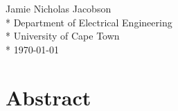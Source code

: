 \documentclass[a4paper, 12pt, oneside, openright, parskip=full]{book}
\newcommand{\auth}{Jamie Nicholas Jacobson}								%
\newcommand{\dept}{Department of Electrical Engineering}%
\newcommand{\uni}{University of Cape Town}				%
\newcommand*{\signature}[1]
{
	\par\noindent\makebox [5cm]{\hrulefill}
	\par\noindent\makebox [5cm][1]{#1}
}
\begin{document}
\begin{flushright}	%
	\vskip 6cm
	\noindent \signature{x}
	\noindent \auth \\*
	\vskip 2mm
	\noindent \dept \\*
	\noindent \uni \\*
	\vskip 2mm
	\noindent \today
\end{flushright}

\chapter{Abstract}				
\label{ch:abs}
\end{document}
